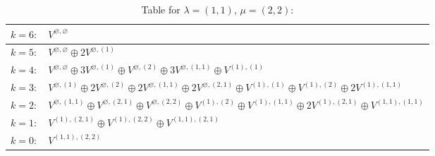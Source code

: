 \documentclass[a4paper,12pt]{article}
\begin{document}
\renewcommand{\arraystretch}{1.6} 
\begin{table}[H]
\centering
\caption{Table for $\lambda = (1, 1)$, $\mu = (2, 2)$:}
\begin{tabular}{|>{\centering\arraybackslash}p{15cm}|}
\hline
 $k = 6: \quad V^{\varnothing, \varnothing} $ \\ \hline
 $k = 5: \quad V^{\varnothing, \varnothing} \oplus 2 V^{\varnothing, (1)} $ \\ \hline
 $k = 4: \quad V^{\varnothing, \varnothing} \oplus 3 V^{\varnothing, (1)} \oplus V^{\varnothing, (2)} \oplus 3 V^{\varnothing, (1, 1)} \oplus V^{(1), (1)} $ \\ \hline
 $k = 3: \quad V^{\varnothing, (1)} \oplus 2 V^{\varnothing, (2)} \oplus 2 V^{\varnothing, (1, 1)} \oplus 2 V^{\varnothing, (2, 1)} \oplus V^{(1), (1)} \oplus V^{(1), (2)} \oplus 2 V^{(1), (1, 1)} $ \\ \hline
 $k = 2: \quad V^{\varnothing, (1, 1)} \oplus V^{\varnothing, (2, 1)} \oplus V^{\varnothing, (2, 2)} \oplus V^{(1), (2)} \oplus V^{(1), (1, 1)} \oplus 2 V^{(1), (2, 1)} \oplus V^{(1, 1), (1, 1)} $ \\ \hline
 $k = 1: \quad V^{(1), (2, 1)} \oplus V^{(1), (2, 2)} \oplus V^{(1, 1), (2, 1)} $ \\ \hline
 $k = 0: \quad V^{(1, 1), (2, 2)} $ \\ \hline
\end{tabular}
\end{table}
\end{document}
